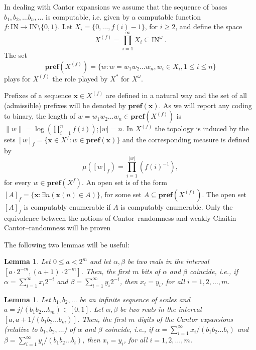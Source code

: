 \documentclass[11pt,a4paper,twoside]{article}
\def \pref#1{{\mathbf{pref}({#1})}}
\newcommand{\x}{{\mathbf x}}
\def \bbbn {\mathrm{I\!N}} %
\def \XF  {X^{(f)}}
\newtheorem{lem}[theo]{Lemma}
\begin{document}
In dealing with  Cantor expansions we  assume that the sequence of bases
$b_1, b_2, \ldots b_n, \ldots$ is computable, i.e.  given by a computable
function  $f:\bbbn\to \bbbn\setminus\{0,1\}$. Let  $X_i=\{0,\dots,
f(i)-1\}$, for
$i\ge 2$,  and define the space $$X^{(f)} = \prod_{i=1}^\infty X_i\subseteq
\bbbn^\omega\ .$$ 
The set 
$$\pref {X^{(f)}} = \{ w : w = w_1 w_2 \ldots w_n, w_i \in X_i, 1 \le i \le
n\}$$
plays for $X^{(f)}$ the role played by $X^*$ for $X^{\omega}$.

Prefixes of a sequence $\x \in X^{(f)}$  are defined in a natural way and
the set of all (admissible) prefixes  will be denoted by $\pref{\x}$.  As we
will report any coding to binary, the length of $w= w_1 w_2 \ldots w_n\in
\pref {X^{(f)}}$ is
$\parallel w \parallel = \log (\prod_{i=1}^{n} f(i)); |w| =n$. In $X^{(f)}$
the topology is induced by the
sets $[w]_{f} = \{\x \in
X^{f} : w\in\pref{\x} \}$ and the corresponding measure is defined by
$$\mu([w]_{f})
= \prod_{i=1}^{|w|} (f(i)^{-1}),$$ for every $w \in \pref{X^{f}}$.
An open set is of the form $[A]_f = \{\x : \exists n (\x(n)\in A)\}$, for some set
$A\subseteq
\pref{\XF}$. The open set $[A]_f$ is computably enumerable if $A$ is
computably enumerable.
Only the equivalence between the notions of Cantor--randomness
and  
weakly Chaitin-Cantor--randomness will be proven

The following two lemmas will be useful:

\begin{lem}
\label{binapprox}
Let $0 \le a < 2^{m}$ and let $\alpha, \beta$ be two reals in the interval
$[a\cdot 2^{-m}, (a+1)\cdot 2^{-m}]$. Then, the first $m$ bits of $\alpha$
and $\beta$ coincide, i.e., if $\alpha = \sum_{i=1}^{\infty} x_{i}2^{-i}$
and $\beta = \sum_{i=1}^{\infty} y_{i}2^{-i}$, then $x_{i}=y_{i}$, for all
$i =1,2, \ldots ,m$.
\end{lem}


\begin{lem}
\label{cantorapprox}
Let $b_{1}, b_{2}, \ldots$ be an infinite sequence of scales
and $a= j/(b_{1}b_{2}\ldots b_{m})\in [0,1]. $  Let $\alpha, \beta$ be two reals in the interval
$[a, a + 1/(b_{1}b_{2}\ldots b_{m})]$. Then, the first $m$ digits of the
Cantor expansions (relative to $b_{1}, b_{2}, \ldots$) of $\alpha$ and
$\beta$ coincide, i.e., if $\alpha = \sum_{i=1}^{\infty}
x_{i}/(b_{1}b_{2}\ldots b_{i})$
and $\beta = \sum_{i=1}^{\infty} y_{i}/(b_{1}b_{2}\ldots b_{i})$, then
$x_{i}=y_{i}$, for all $i =1,2, \ldots ,m$.
\end{lem}
\end{document}
